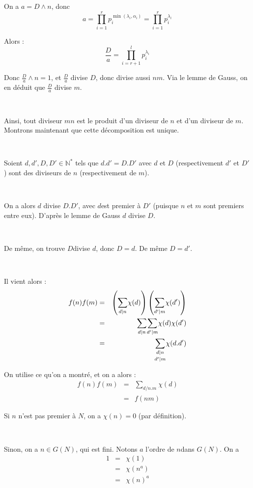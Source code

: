 On a $a = D \wedge n$, donc
\[ a = \underset{i = 1}{\overset{r}{\prod}} p^{\min (\lambda_i, \alpha_i)}_i =
   \underset{i = 1}{\overset{r}{\prod}} {{p^{\lambda_i}_i}_{}}_{} \]


Alors :
\[ \frac{D}{a} = \underset{i = r + 1}{\overset{l}{\prod}}
   {{p^{\lambda_i}_i}_{}}_{} \]


Donc $\frac{D}{a} \wedge n = 1$, et $\frac{D}{a}$ divise $D$, donc divise
aussi $n m$. Via le lemme de Gauss, on en d{\'e}duit que $\frac{D}{a}$ divise
$m$.

\

Ainsi, tout diviseur $m n$ est le produit d'un diviseur de $n$ et d'un
diviseur de $m$. Montrons maintenant que cette d{\'e}composition est unique.

\

Soient $d, d', D, D' \in \mathbb{N}^{\ast}$ tels que $d.d' = D.D'$ avec $d$
et $D$ (respectivement $d'$ et $D'$) sont des diviseurs de $n$ (respectivement
de $m$).

\

On a alors $d$ divise $D.D'$, avec $d$est premier {\`a} $D'$ (puisque $n$ et
$m$ sont premiers entre eux). D'apr{\`e}s le lemme de Gauss $d$ divise $D$.

\

De m{\^e}me, on trouve $D$divise $d$, donc $D = d$. De m{\^e}me $D = d'$.

\

Il vient alors :
\begin{eqnarray*}
  f (n) f (m) & = & \left( \underset{d |  n}{\sum} \chi (d) \right)
  \left( \underset{d' |  m}{\sum} \chi (d') \right)\\
  & = & \underset{d |  n}{\sum}  \underset{d' |  m}{\sum}
  \chi (d) \chi (d')\\
  & = & \underset{d' |  m}{\underset{d |  n}{\sum}} \chi
  (d.d')
\end{eqnarray*}


On utilise ce qu'on a montr{\'e}, et on a alors :
\begin{eqnarray*}
  f (n) f (m) & = & \underset{}{\underset{d / n.m}{\sum}} \chi (d)\\
  & = & f (n m)
\end{eqnarray*}


Si $n$ n'est pas premier {\`a} $N$, on a $\chi (n) = 0$ (par d{\'e}finition).

\

Sinon, on a $n \in G (N)$, qui est fini. Notons $a$ l'ordre de $n$dans $G
(N)$. On a
\begin{eqnarray*}
  1 & = & \chi (1)\\
  & = & \chi (n^a)\\
  & = & \chi (n)^a
\end{eqnarray*}



